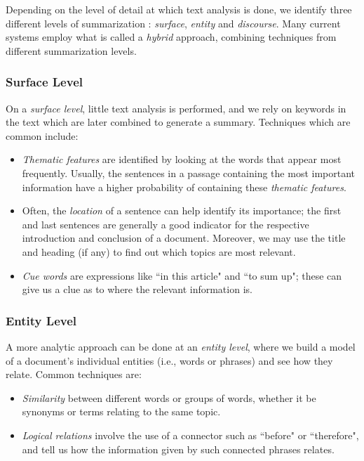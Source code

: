 Depending on the level of detail at which text analysis is done, we identify three different levels of summarization \cite{lloret_text_2008}: \textit{surface}, \textit{entity} and \textit{discourse}. Many current systems employ what is called a \textit{hybrid} approach, combining techniques from different summarization levels.

\subsubsection*{Surface Level}

On a \textit{surface level}, little text analysis is performed, and we rely on keywords in the text which are later combined to generate a summary. Techniques which are common include:

\begin{itemize}
\item \textit{Thematic features} are identified by looking at the words that appear most frequently. Usually, the sentences in a passage containing the most important information have a higher probability of containing these \textit{thematic features}.
\item Often, the \textit{location} of a sentence can help identify its importance; the first and last sentences are generally a good indicator for the respective introduction and conclusion of a document. Moreover, we may use the title and heading (if any) to find out which topics are most relevant.
\item \textit{Cue words} are expressions like ``in this article" and ``to sum up"; these can give us a clue as to where the relevant information is.
\end{itemize}

\subsubsection*{Entity Level}

A more analytic approach can be done at an \textit{entity level}, where we build a model of a document's individual entities (i.e., words or phrases) and see how they relate. Common techniques are:

\begin{itemize}
\item \textit{Similarity} between different words or groups of words, whether it be synonyms or terms relating to the same topic.
\item \textit{Logical relations} involve the use of a connector such as ``before" or ``therefore", and tell us how the information given by such connected phrases relates.
\end{itemize}

